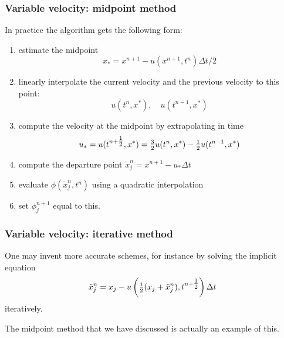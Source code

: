 \documentclass[aspectratio=43,9pt]{beamer}
\begin{document}
%
%
\begin{frame}
	\frametitle{Variable velocity: midpoint method}
	In practice the algorithm gets the following form:
	\begin{enumerate}
		\item estimate the midpoint
			\[x_*= x^{n+1} - u(x^{n+1}, t^n ) \Delta t/2 \]
		\item linearly interpolate the current velocity and the previous velocity to this point:
			\[u(t^n,x^*),\quad u(t^{n-1},x^*)\]
		\item compute the velocity at the midpoint by extrapolating in time
			\[u_*=u ( t^{n+{\textstyle\frac{1}{2}}}, x^* ) = {\textstyle\frac{3}{2}} u(t^n,x^*) - {\textstyle\frac{1}{2}} u(t^{n-1},x^*)\]
		\item compute the departure point $\tilde x_j^n = x^{n+1} - u_* \Delta t$
		\item evaluate $\phi ( \tilde x_j^n, t^n)$ using a quadratic interpolation
		\item set $\phi_j^{n+1}$ equal to this.
	\end{enumerate}
\end{frame}
%
%
\begin{frame}
	\frametitle{Variable velocity: iterative method}
	\begin{myitemize}{2ex}
		\item One may invent more accurate schemes, for instance by solving the implicit equation
			\begin{equation*}
				\tilde x_j^n = x_j - u \left( {\textstyle\frac{1}{2}} (x_j + \tilde x_j^n ), t^{n+{\textstyle\frac{1}{2}}}\right)\Delta t
			\end{equation*}
			iteratively.
		\item The midpoint method that we have discussed is actually an example of this.	
	\end{myitemize}
\end{frame}
%
%
\end{document}
